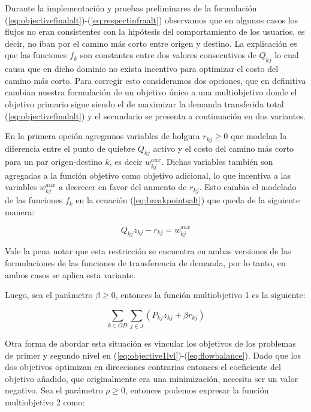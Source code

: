Durante la implementación y pruebas preliminares de la formulación (\ref{eq:objectivefinalalt})-(\ref{eq:respectinfraalt}) observamos que en algunos casos los flujos no eran consistentes con la hipótesis del comportamiento de los usuarios, es decir, no iban por el camino más corto entre origen y destino. La explicación es que las funciones $f_k$ son constantes entre dos valores consecutivos de $Q_{kj}$ lo cual causa que en dicho dominio no exista incentivo para optimizar el costo del camino más corto. Para corregir esto consideramos dos opciones, que en definitiva cambian nuestra formulación de un objetivo único a una multiobjetivo donde el objetivo primario sigue siendo el de maximizar la demanda transferida total (\ref{eq:objectivefinalalt}) y el secundario se presenta a continuación en dos variantes.

En la primera opción agregamos variables de holgura $r_{kj} \geq 0$ que modelan la diferencia entre el punto de quiebre $Q_{kj}$ activo y el costo del camino más corto para un par origen-destino $k$, es decir $w^{aux}_{kj}$. Dichas variables también son agregadas a la función objetivo como objetivo adicional, lo que incentiva a las variables $w^{aux}_{kj}$ a decrecer en favor del aumento de $r_{kj}$. Esto cambia el modelado de las funciones $f_k$ en la ecuación (\ref{eq:breakpointsalt}) que queda de la siguiente manera:

\begin{equation}
  \label{eq:multipleobj1breakpoint}
  Q_{kj} z_{kj} - r_{kj} = w^{aux}_{kj}
\end{equation}

Vale la pena notar que esta restricción se encuentra en ambas versiones de las formulaciones de las funciones de transferencia de demanda, por lo tanto, en ambos casos se aplica esta variante.

Luego, sea el parámetro $\beta \geq 0$, entonces la función multiobjetivo 1 es la siguiente:

\begin{equation}
  \label{eq:multipleobj1}
  \sum_{k \in OD} \sum_{j \in J} \left( P_{kj}z_{kj} + \beta r_{kj} \right)
\end{equation}

Otra forma de abordar esta situación es vincular los objetivos de los problemas de primer y segundo nivel en (\ref{eq:objective1lvl})-(\ref{eq:flowbalance}). Dado que los dos objetivos optimizan en direcciones contrarias entonces el coeficiente del objetivo añadido, que originalmente era una minimización, necesita ser un valor negativo. Sea el parámetro $\rho \geq 0$, entonces podemos expresar la función multiobjetivo 2 como:


